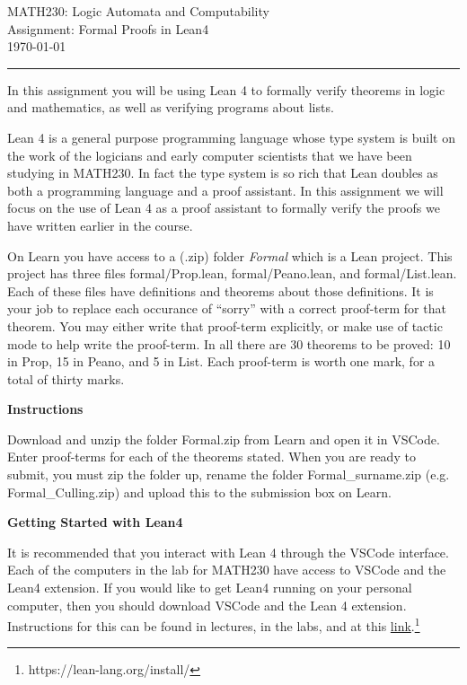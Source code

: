 \documentclass[12pt,letterpaper, onecolumn]{exam}
\begin{document}
\begingroup  
    \centering
    \LARGE MATH230: Logic Automata and Computability\\
    \LARGE Assignment: Formal Proofs in Lean4\\[0.5em]
    \large \today\\[0.5em]
\endgroup
\rule{\textwidth}{0.4pt}
\pointsdroppedatright   %
\printanswers
\renewcommand{\solutiontitle}{\noindent\textbf{Ans:}\enspace}   %



In this assignment you will be using Lean 4 to formally verify theorems in logic and mathematics, as well as verifying programs about lists. 

Lean 4 is a general purpose programming language whose type system is built on the work of the logicians and early computer scientists that we have been studying in MATH230. In fact the type system is so rich that Lean doubles as both a programming language and a proof assistant. In this assignment we will focus on the use of Lean 4 as a proof assistant to formally verify the proofs we have written earlier in the course. 

On Learn you have access to a (.zip) folder \emph{Formal} which is a Lean project. This project has three files formal/Prop.lean, formal/Peano.lean, and formal/List.lean. Each of these files have definitions and theorems about those definitions. It is your job to replace each occurance of ``sorry'' with a correct proof-term for that theorem. You may either write that proof-term explicitly, or make use of tactic mode to help write the proof-term. In all there are 30 theorems to be proved: 10 in Prop, 15 in Peano, and 5 in List. Each proof-term is worth one mark, for a total of thirty marks.

\vspace{2mm}
\textbf{Instructions}

Download and unzip the folder Formal.zip from Learn and open it in VSCode. Enter proof-terms for each of the theorems stated. When you are ready to submit, you must zip the folder up, rename the folder Formal\_surname.zip (e.g. Formal\_Culling.zip) and upload this to the submission box on Learn.

\vspace{2mm}
\textbf{Getting Started with Lean4}

It is recommended that you interact with Lean 4 through the VSCode interface. Each of the computers in the lab for MATH230 have access to VSCode and the Lean4 extension. If you would like to get Lean4 running on your personal computer, then you should download VSCode and the Lean 4 extension. Instructions for this can be found in lectures, in the labs, and at this \href{https://lean-lang.org/install/}{link}.\footnote{https://lean-lang.org/install/}
\end{document}

